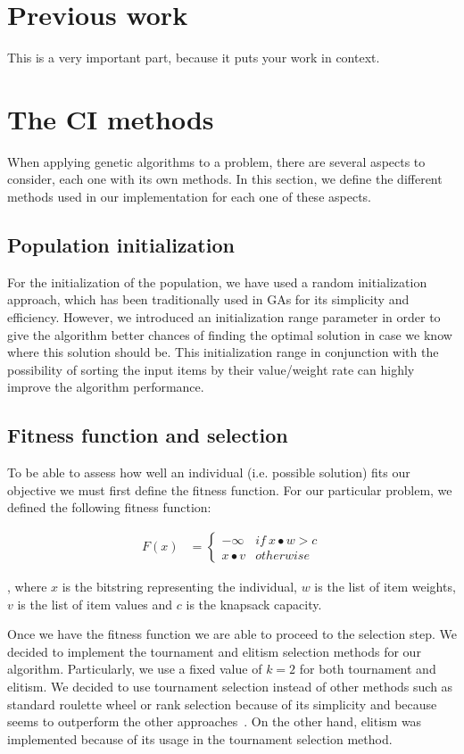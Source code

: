 \documentclass[anon]{CI}
\begin{document}
\section{Previous work}

This is a very important part, because it puts your work in context.

\section{The CI methods}\label{sec:ci-methods}
When applying genetic algorithms to a problem, there are several aspects to consider, each one with its own methods. In this section, we define the different methods used in our implementation for each one of these aspects.

\subsection{Population initialization}
For the initialization of the population, we have used a random initialization approach, which has been traditionally used in GAs for its simplicity and efficiency. However, we introduced an initialization range parameter in order to give the algorithm better chances of finding the optimal solution in case we know where this solution should be. This initialization range in conjunction with the possibility of sorting the input items by their value/weight rate can highly improve the algorithm performance.

\subsection{Fitness function and selection}
To be able to assess how well an individual (i.e. possible solution) fits our objective we must first define the fitness function. For our particular problem, we defined the following fitness function:

\begin{align*}
F(x) & =\begin{cases}
-\infty & if\:x\bullet w>c\\
x\bullet v & otherwise
\end{cases}
\end{align*}

\noindent, where $x$ is the bitstring representing the individual, $w$ is the list of item weights, $v$ is the list of item values and $c$ is the knapsack capacity.

Once we have the fitness function we are able to proceed to the selection step. We decided to implement the tournament and elitism selection methods for our algorithm. Particularly, we use a fixed value of $k=2$ for both tournament and elitism. We decided to use tournament selection instead of other methods such as standard roulette wheel or rank selection because of its simplicity and because seems to outperform the other approaches~\cite{razali2011genetic}. On the other hand, elitism was implemented because of its usage in the tournament selection method.
\end{document}
